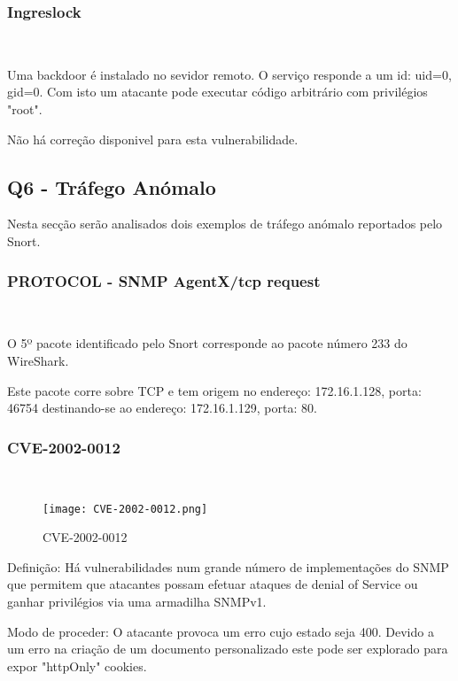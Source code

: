 \subsubsection{Ingreslock}
\hfill\\
\par Uma backdoor é instalado no sevidor remoto. O serviço responde a um id: uid=0, gid=0. Com isto um atacante pode executar código arbitrário com privilégios "root".
\par Não há correção disponivel para esta vulnerabilidade.




\subsection{Q6 - Tráfego Anómalo}

Nesta secção serão analisados dois exemplos de tráfego anómalo reportados pelo Snort.

\subsubsection{PROTOCOL - SNMP AgentX/tcp request}
\hfill\\
\par O 5º pacote identificado pelo Snort corresponde ao pacote número 233 do WireShark.
\par Este pacote corre sobre TCP e tem origem no endereço: 172.16.1.128, porta: 46754 destinando-se ao endereço: 172.16.1.129, porta: 80.

\subsubsection{CVE-2002-0012}
\hfill\\
\begin{figure}[H]

  \centering

  \texttt{[image: CVE-2002-0012.png]}

  \caption {CVE-2002-0012}

  \label {fig2}

\end{figure}

\par Definição: Há vulnerabilidades num grande número de implementações do SNMP que permitem que atacantes possam efetuar ataques de denial of Service ou ganhar privilégios via uma armadilha SNMPv1.

\par Modo de proceder: O atacante provoca um erro cujo estado seja 400. Devido a um erro na criação de um documento personalizado este pode ser explorado para expor "httpOnly" cookies.

